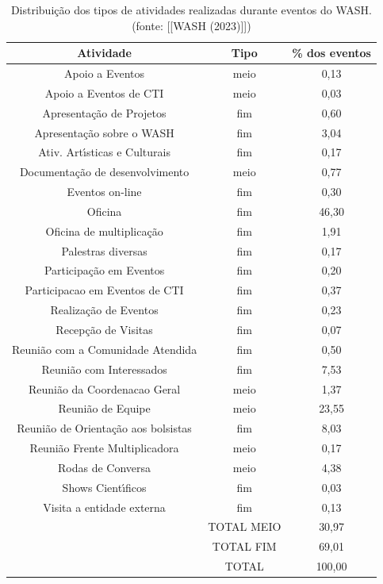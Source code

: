 \documentclass[
12pt,		%
openright,	%
twoside,  %
a4paper,			%
chapter=TITLE,		%
english,			%
french,				%
spanish,			%
brazil				%
]{USPSC-classe/USPSC}
\begin{document}
\begin{table}[htb]
\tiny
\caption{\label{a5eaff3e0d7afe3bcccdccd277cae286bd506174}Distribui\c{c}\~ao dos tipos de atividades realizadas durante eventos do WASH. (fonte:  [[WASH (2023)]])}

\centering
\begin{tabular}{|c|c|c|}
\hline
Atividade  &  Tipo  &  \% dos eventos \\
\hline
Apoio a Eventos  &  meio  &  0,13 \\
Apoio a Eventos de CTI  &  meio  &  0,03 \\
Apresenta\c{c}\~ao de Projetos  &  fim  &  0,60 \\
Apresenta\c{c}\~ao sobre o WASH  &  fim  &  3,04 \\
Ativ. Art\'{\i}sticas e Culturais  &  fim  &  0,17 \\
Documenta\c{c}\~ao de desenvolvimento  &  meio  &  0,77 \\
Eventos on-line  &  fim  &  0,30 \\
Oficina  &  fim  &  46,30 \\
Oficina de multiplica\c{c}\~ao  &  fim  &  1,91 \\
Palestras diversas  &  fim  &  0,17 \\
Participa\c{c}\~ao em Eventos  &  fim  &  0,20 \\
Participacao em Eventos de CTI  &  fim  &  0,37 \\
Realiza\c{c}\~ao de Eventos  &  fim  &  0,23 \\
Recep\c{c}\~ao de Visitas  &  fim  &  0,07 \\
Reuni\~ao com a Comunidade Atendida  &  fim  &  0,50 \\
Reuni\~ao com Interessados  &  fim  &  7,53 \\
Reuni\~ao da Coordenacao Geral  &  meio  &  1,37 \\
Reuni\~ao de Equipe  &  meio  &  23,55 \\
Reuni\~ao de Orienta\c{c}\~ao aos bolsistas  &  fim  &  8,03 \\
Reuni\~ao Frente Multiplicadora  &  meio  &  0,17 \\
Rodas de Conversa  &  meio  &  4,38 \\
Shows Cient\'{\i}ficos  &  fim  &  0,03 \\
Visita a entidade externa  &  fim  &  0,13 \\
\hline
  &  TOTAL MEIO  &  30,97 \\
  &  TOTAL FIM  &  69,01  \\
  &  TOTAL  &  100,00 \\
\hline
\end{tabular}
\end{table}
\end{document}
